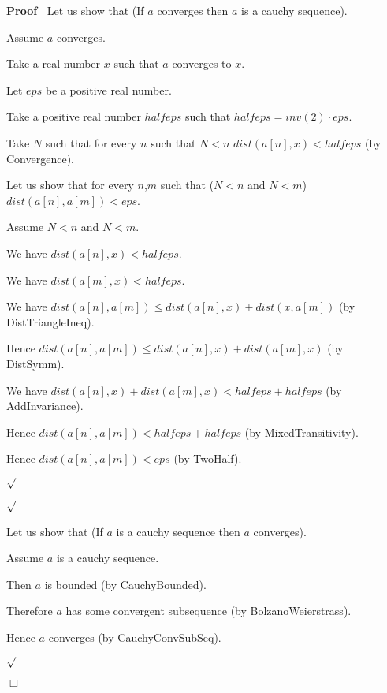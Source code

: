\documentclass{article}
\newenvironment{forthel}{\begin{leftbar}}{\end{leftbar}}
\newenvironment{proof}{\noindent\textbf{Proof\ }}{\hspace*{\fill}$\Box$\medskip}
\newenvironment{subproof}{\begin{list}{}{}
		\item[\text{Proof}]}{\hfill $\surd$ \end{list}}
\begin{document}
\begin{forthel}
	\begin{proof}
		Let us show that (If $a$ converges then $a$ is a cauchy sequence).
		
		\begin{subproof}
			Assume $a$ converges.
			
			Take a real number $x$ such that $a$ converges to $x$.
			
			Let $eps$ be a positive real number.
			
			Take a positive real number $halfeps$ such that $halfeps = inv(2) \cdot eps$.
			
			Take $N$ such that for every $n$ such that $N < n$ $dist(a[n],x) < halfeps$ (by Convergence).
			
			Let us show that for every $n$,$m$ such that ($N < n$ and $N < m$) $dist(a[n],a[m]) < eps$.
			
			\begin{subproof}
				Assume $N < n$ and $N < m$.
				
				We have $dist(a[n],x) < halfeps$.
				
				We have $dist(a[m],x) < halfeps$.
				
				We have $dist(a[n],a[m]) \leq dist(a[n],x) + dist(x,a[m])$ (by DistTriangleIneq).
				
				Hence $dist(a[n],a[m]) \leq dist(a[n],x) + dist(a[m],x)$ (by DistSymm).
				
				We have $dist(a[n],x) + dist(a[m],x) < halfeps + halfeps$ (by AddInvariance).
				
				Hence $dist(a[n],a[m]) < halfeps + halfeps$ (by MixedTransitivity).
				
				Hence $dist(a[n],a[m]) < eps$ (by TwoHalf).
				
			\end{subproof}
			
		\end{subproof}
		
		Let us show that (If $a$ is a cauchy sequence then $a$ converges).
		
		\begin{subproof}
			Assume $a$ is a cauchy sequence.
			
			Then $a$ is bounded (by CauchyBounded).
			
			Therefore $a$ has some convergent subsequence (by BolzanoWeierstrass).
			
			Hence $a$ converges (by CauchyConvSubSeq).
			
		\end{subproof}
	\end{proof}
	

\end{forthel}
\end{document}
